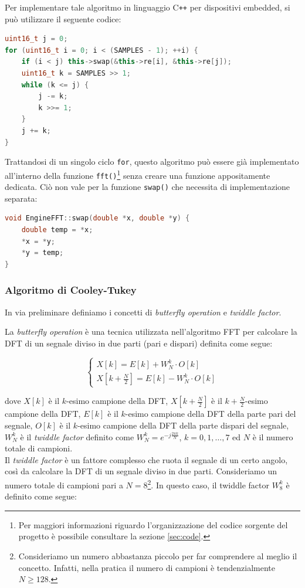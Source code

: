 \documentclass[a4paper,12pt]{report}  %
\newcommand{\lstinlinebg}[1]{\colorbox{backcolour}{\lstinline|#1|}}
\begin{document}
Per implementare tale algoritmo in linguaggio C\texttt{++} per dispositivi embedded, si può utilizzare il seguente codice:
\begin{lstlisting}[language=C++, keywords={void, uint16_t, while, for, if, this}]
uint16_t j = 0;
for (uint16_t i = 0; i < (SAMPLES - 1); ++i) {
    if (i < j) this->swap(&this->re[i], &this->re[j]);
    uint16_t k = SAMPLES >> 1;
    while (k <= j) {
        j -= k;
        k >>= 1;
    }
    j += k;
}
\end{lstlisting}
Trattandosi di un singolo ciclo \lstinlinebg{for}, questo algoritmo può essere già implementato all'interno della funzione \lstinlinebg{fft()}\footnote{Per maggiori informazioni riguardo l'organizzazione del codice sorgente del progetto è possibile consultare la sezione \ref{sec:code}.} senza creare una funzione appositamente dedicata.
Ciò non vale per la funzione \lstinlinebg{swap()} che necessita di implementazione separata:
\begin{lstlisting}[language=C++, keywords={void, double}]
void EngineFFT::swap(double *x, double *y) {
    double temp = *x;
    *x = *y;
    *y = temp;
}
\end{lstlisting}

\subsubsection{Algoritmo di Cooley-Tukey}
In via preliminare definiamo i concetti di \textit{butterfly operation} e \textit{twiddle factor}.

La \textit{butterfly operation} è una tecnica utilizzata nell'algoritmo FFT per calcolare la DFT di un segnale diviso in due parti (pari e dispari) definita come segue:

\begin{equation}
    \begin{cases}
        X[k] = E[k] + W_N^k \cdot O[k] \\
        X[k + \frac{N}{2}] = E[k] - W_N^k \cdot O[k]
    \end{cases} \label{eq:butterfly}
\end{equation}

dove $X[k]$ è il $k$-esimo campione della DFT, $X[k + \frac{N}{2}]$ è il $k + \frac{N}{2}$-esimo campione della DFT, $E[k]$ è il $k$-esimo campione della DFT della parte pari del segnale, $O[k]$ è il $k$-esimo campione della DFT della parte dispari del segnale, $W_N^k$ è il \textit{twiddle factor} definito come $W_N^k = e^{-j \frac{2 \pi k}{N}}$, $k = 0, 1, \ldots, 7$ ed $N$ è il numero totale di campioni.
\noindent\\ Il \textit{twiddle factor} è un fattore complesso che ruota il segnale di un certo angolo, così da calcolare la DFT di un segnale diviso in due parti.
Consideriamo un numero totale di campioni pari a $N = 8$\footnote{Consideriamo un numero abbastanza piccolo per far comprendere al meglio il concetto. Infatti, nella pratica il numero di campioni è tendenzialmente $N \geq 128$.}.
In questo caso, il twiddle factor $W_8^k$ è definito come segue:
\end{document}
